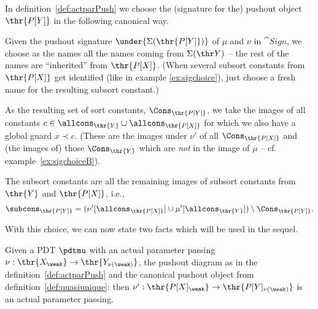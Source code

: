 \begin{definition}\label{def:quasiunique}
In definition~\ref{def:actparPush} we choose the (signature for the)
pushout object $\thr{P[Y]}$ in the following canonical way. 

Given the pushout signature $\under{\Sigma(\thr{P[Y]})}$ of $\mu$ and $\nu$ in
$\cat{Sign}$, we choose as the names all the names coming from $\Sigma(\thr
Y)$ -- the rest of the names are ``inherited'' from $\thr{P[X]}$. 
(When several subsort constants from $\thr{P[X]}$ get identified (like in example
\ref{ex:sigchoice}), just choose a fresh name for the resulting subsort constant.)

As the resulting set of sort constants, 
$\Cons_{\thr{P[Y]}}$, we take the images of all constants
$c\in\allcons_{\thr{Y}}\cup\allcons_{\thr{P[X]}}$ for which we also have a
global guard $x\prec c$. (These are 
the images under $\nu'$ of all
$\Cons_{\thr{P[X]}}$ and (the images of) those
$\Cons_{\thr{Y}}$ which are {\em not} in the image of $\mu$ --
cf. example~\ref{ex:sigchoiceB}). 

The subsort constants are all the remaining images of subsort constants from
$\thr{Y}$ and $\thr{P[X]}$, i.e., 
\[\subcons_{\thr{P[Y]}} = (\nu'[\allcons_{\thr{P[X]}}] \cup
\mu'[\allcons_{\thr{Y}}]) \setminus \Cons_{\thr{P[Y]}}.
\]
\end{definition}
%
With this choice, we can now state two facts which will
be used in the sequel.
%
\begin{lemma}\label{le:weakmu}
Given a PDT $\pdtmu$ with an actual parameter
passing $\nu: \thr{X_\weak} \to \thr{Y_{\nu(\weak)}}$,
the pushout diagram as in the definition~\ref{def:actparPush} and the
canonical pushout object from definition~\ref{def:quasiunique}:
then $\nu': \thr{P[X]_\weak} \to \thr{P[Y]_{\nu(\weak)}}$ is an actual
parameter passing. 
\end{lemma}
